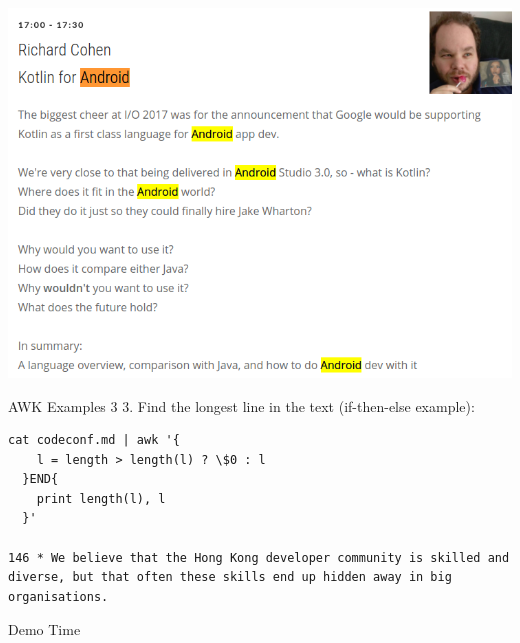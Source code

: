 \documentclass[unicode, notheorems, aspectratio=169]{beamer}
\begin{document}
{
\begin{frame}
\end{frame}
}
	
\begin{frame}
\begin{center}
	\includegraphics[height=.95\paperheight]{./images/seo-android}
\end{center}
\end{frame}

\begin{frame}[fragile]{AWK Examples 3}
3. Find the longest line in the text (if-then-else example):
\begin{verbatim}
cat codeconf.md | awk '{
    l = length > length(l) ? \$0 : l
  }END{
    print length(l), l
  }'

146 * We believe that the Hong Kong developer community is skilled and
diverse, but that often these skills end up hidden away in big organisations.
\end{verbatim}
\begin{center}
{\huge Demo Time}
\end{center}
\end{frame}
\end{document}
